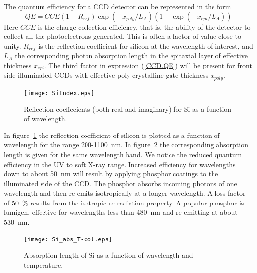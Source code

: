 The quantum efficiency for a CCD detector can be represented in the form
\begin{equation}
  QE = CCE(1-R_{ref}) \exp(-x_{poly}/L_A) (1-\exp(-x_{epi}/L_A))
  \label{CCD.QE}
\end{equation}
Here $CCE$ is the charge collection efficiency, that is, the ability
of the detector to collect all the photoelectrons generated. This is
often a factor of value close to unity. $R_{ref}$ is the reflection
coefficient for silicon at the wavelength of interest, and $L_A$ the
corresponding photon absorption length in the epitaxial layer of
effective thickness $x_{epi}$. The third factor in expression
(\ref{CCD.QE}) will be present for front side illuminated CCDs with
effective poly-crystalline gate thickness $x_{poly}$. 

\begin{figure}[h!]
	\centering
	\texttt{[image: SiIndex.eps]}
	\caption{Reflection coeffecients (both real and imaginary) for Si as a function
		of wavelength.}
	\label{fig:si-refl}
\end{figure}

In figure~\ref{fig:si-refl} the reflection 
coefficient of silicon is plotted as a function of wavelength for the range 
200-1100~nm. In figure~\ref{fig:si-abs} the
corresponding absorption length is given for the same wavelength band.
We notice the reduced quantum efficiency in the UV to soft X-ray
range. Increased efficiency for wavelengths down to about 50~nm will
result by applying phosphor coatings to the illuminated side of the
CCD. The phosphor absorbs incoming photons of one wavelength and then
re-emits isotropically at a longer wavelength. A loss factor of 50~\%
results from the isotropic re-radiation property. A popular phosphor
is lumigen, effective for wavelengths less than 480~nm and
re-emitting at about 530~nm. 

\begin{figure}[h!]
	\centering
	\texttt{[image: Si\_abs\_T-col.eps]}
	\caption{Absorption length of Si as a function of wavelength and temperature.}
	\label{fig:si-abs}
\end{figure}

